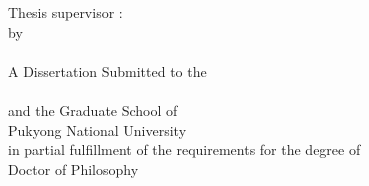 \clearpage
\thispagestyle{titlingpage}

\noindent

\begin{center}

{\huge \bfseries \titleEN} \\
\vspace{0.2cm}
{\huge \bfseries \titleKR} \\
\vspace{1cm}
{\Large Thesis supervisor :  \supervisorEN}\\
\vspace{1cm}
{by}\\
{\LARGE \authorEN} \\

\vspace{0.5cm}
{\LARGE A Dissertation Submitted to the\\
           \major \\
	\vspace{-1ex}
and the Graduate School of \\
Pukyong National University \\
	\vspace{-1ex}
in partial fulfillment of the requirements for the degree of \\
	\vspace{-1ex}
     Doctor of Philosophy \\}
\vspace{1.0cm}
{\Large \submitdate}


%
%

\end{center}
